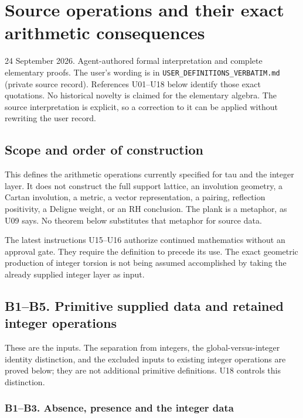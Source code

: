 \section{Source operations and their exact arithmetic
consequences}\label{uad-source-operations-and-their-exact-arithmetic-consequences}

24 September 2026. Agent-authored formal interpretation and complete
elementary proofs. The user's wording is in
\nolinkurl{USER_DEFINITIONS_VERBATIM.md} (private source record). References U01--U18 below identify
those exact quotations. No historical novelty is claimed for the
elementary algebra. The source interpretation is explicit, so a
correction to it can be applied without rewriting the user record.

\subsection{Scope and order of
construction}\label{uad-scope-and-order-of-construction}

This defines the arithmetic operations currently specified for tau and
the integer layer. It does not construct the full support lattice, an
involution geometry, a Cartan involution, a metric, a vector
representation, a pairing, reflection positivity, a Deligne weight, or
an RH conclusion. The plank is a metaphor, as U09 says. No theorem below
substitutes that metaphor for source data.

The latest instructions U15--U16 authorize continued mathematics without
an approval gate. They require the definition to precede its use. The
exact geometric production of integer torsion is not being assumed
accomplished by taking the already supplied integer layer as input.

\subsection{B1--B5. Primitive supplied data and retained integer
operations}\label{uad-b1b5.-primitive-supplied-data-and-retained-integer-operations}

These are the inputs. The separation from integers, the
global-versus-integer identity distinction, and the excluded inputs to
existing integer operations are proved below; they are not additional
primitive definitions. U18 controls this distinction.

\subsubsection{B1--B3. Absence, presence and the integer
data}\label{uad-b1b3.-absence-presence-and-the-integer-data}

